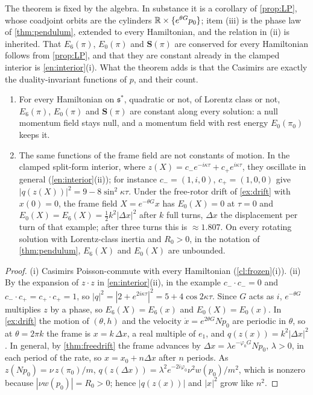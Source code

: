 The theorem is fixed by the algebra. In substance it is a corollary of \cref{prop:LP}, whose coadjoint orbits are the cylinders
$\mathbb{R}\times\{e^{\theta G}p_0\}$; item (iii) is the phase law of \cref{thm:pendulum}, extended to every Hamiltonian, and the relation in (ii) is
inherited. That $E_6(\pi)$, $E_0(\pi)$ and $\mathbf S(\pi)$ are conserved for every Hamiltonian follows from \cref{prop:LP}, and that they are constant already in the clamped
interior is \cref{en:interior}(i). What the theorem adds is that the Casimirs are exactly the duality-invariant functions of $p$, and their count.

\begin{corollary}
\label{cl:nogen}
\begin{enumerate}[label=(\roman*),leftmargin=2.2em]
\item For every Hamiltonian on $\mathfrak s^*$, quadratic or not, of Lorentz class or not, $E_6(\pi)$, $E_0(\pi)$ and $\mathbf S(\pi)$ are constant
along every solution: a null momentum field stays null, and a momentum field with rest energy $E_0(\pi_0)$ keeps it.
\item The same functions of the frame field are not constants of motion. In the clamped split-form interior, where
$z(X)=c_-e^{-i\kappa\tau}+c_+e^{i\kappa\tau}$, they oscillate in general (\cref{en:interior}(ii)); for instance $c_-=(1,i,0)$, $c_+=(1,0,0)$ give
$|q(z(X))|^2=9-8\sin^2\kappa\tau$. Under the
free-rotor drift of \cref{ex:drift} with $x(0)=0$, the frame field $X=e^{-\theta G}x$ has $E_0(X)=0$ at $\tau=0$ and
$E_0(X)=E_6(X)=\tfrac12k^2|\Delta x|^2$ after $k$ full turns, $\Delta x$ the displacement per turn of that example; after three turns this is
$\approx1.807$. On every rotating solution with Lorentz-class inertia and $R_0>0$, in the notation of \cref{thm:pendulum}, $E_6(X)$ and
$E_0(X)$ are unbounded.
\end{enumerate}
\end{corollary}

\begin{proof}
(i) Casimirs Poisson-commute with every Hamiltonian (\cref{cl:frozen}(i)). (ii) By the expansion of $z\cdot z$ in \cref{en:interior}(ii), in the example $c_-\cdot c_-=0$ and $c_-\cdot c_+=c_+\cdot c_+=1$, so $|q|^2=|2+e^{2i\kappa\tau}|^2=5+4\cos2\kappa\tau$. Since $G$ acts as $i$,
$e^{-\theta G}$ multiplies $z$ by a phase, so $E_6(X)=E_6(x)$ and $E_0(X)=E_0(x)$. In \cref{ex:drift} the motion of $(\theta,h)$ and the velocity
$\dot x=e^{2\theta G}Np_0$ are periodic in $\theta$, so at $\theta=2\pi k$ the frame is $x=k\,\Delta x$, a real multiple of $e_1$, and
$q(z(x))=k^2|\Delta x|^2$. In general, by \cref{thm:freedrift} the frame advances by $\Delta x=\lambda e^{-\varphi_0G}Np_0$, $\lambda>0$, in each
period of the rate, so $x=x_0+n\Delta x$ after $n$ periods. As $z(Np_0)=\nu\,z(\pi_0)/m$, $q(z(\Delta x))=\lambda^2e^{-2i\varphi_0}\nu^2w(p_0)/m^2$,
which is nonzero because $|\nu w(p_0)|=R_0>0$; hence $|q(z(x))|$ and $|x|^2$ grow like $n^2$.
\end{proof}

